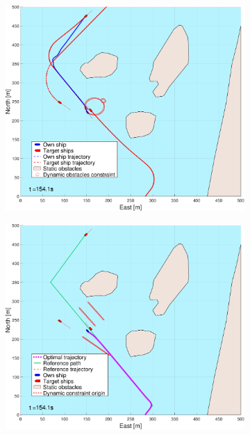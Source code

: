 \begin{figure}[ht]\ContinuedFloat
    \begin{subfigure}[b]{0.494\textwidth}
        \centering
        \includegraphics[width=\textwidth]{Images/NewFigures/Helloya_Rev/_Simple_1fig1_time=155}
        \subcaption{}
    \end{subfigure}
    \hfill
    \begin{subfigure}[b]{0.494\textwidth}
        \centering
        \includegraphics[width=\textwidth]{Images/NewFigures/Helloya_Rev/_Simple_1fig999_time=155}

\end{subfigure}
\end{figure}
